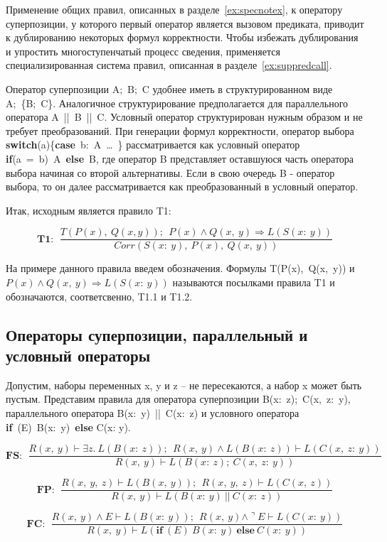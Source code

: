 \documentclass[10pt,a4paper]{article}
\newcommand{\ruleI}[3] {
$$
\mathbf{#1:} ~~
\frac{#2}{#3}
$$
}
\begin{document}
Применение общих правил, описанных в разделе~\ref{ex:specnotex}, к оператору суперпозиции, у которого первый оператор является вызовом предиката, приводит к дублированию некоторых формул корректности. Чтобы избежать дублирования и упростить многоступенчатый процесс сведения, применяется специализированная система правил, описанная в разделе~\ref{ex:suppredcall}.

Оператор суперпозиции A; B; C удобнее иметь в структурированном  виде A; \{B; C\}. Аналогичное структурирование предполагается для параллельного оператора A || B || C. Условный оператор структурирован нужным образом и не требует преобразований. При генерации формул корректности, оператор выбора \textbf{switch}(a)\{\textbf{case} b: A … \} рассматривается как условный оператор \textbf{if}(a = b) A \textbf{else} B, где оператор B представляет оставшуюся часть оператора выбора начиная со второй альтернативы. Если в свою очередь B - оператор выбора, то он далее рассматривается как преобразованный в условный оператор.

Итак, исходным является правило T1:

\ruleI{T1}
{T(P(x),~Q(x, y));~~P(x) \land Q(x,~y) \Rightarrow L(S(x:~y))}
{Corr(S(x:~y),~P(x),~Q(x,~y))}

На примере данного правила введем обозначения. Формулы  T(P(x), Q(x, y)) и $ P(x) \land Q(x,~y) \Rightarrow L(S(x:~y)) $ называются посылками правила T1 и обозначаются, соответсвенно, T1.1 и T1.2.

\subsection{Операторы суперпозиции, параллельный и условный операторы}

Допустим, наборы переменных x, y и z – не пересекаются, а набор x может быть пустым. Представим правила для оператора суперпозиции B(x: z); C(x, z: y), параллельного оператора B(x: y) || C(x: z) и условного оператора \textbf{if} (E) B(x: y) \textbf{else} C(x: y).

\ruleI{FS}
{R(x,~y) \vdash \exists z.~L(B(x:~z));~~R(x,~y) \land L(B(x:~z)) \vdash L(C(x,~z:~y))}
{R(x,~y) \vdash L(B(x:~z);~C(x,~z:~y))}

\ruleI{FP}
{R(x,~y,~z) \vdash L(B(x,~y));~~R(x,~y,~z) \vdash L(C(x,~z))}
{R(x,~y) \vdash L(B(x:~y)~||~C(x:~z))}

\ruleI{FC}
{R(x,~y) \land E \vdash L(B(x:~y));~~R(x,~y) \land \urcorner E \vdash L(C(x:~y))}
{R(x,~y) \vdash L(\mathbf{if}~(E)~B(x:~y)~\mathbf{else}~C(x:~y))}
\end{document}
